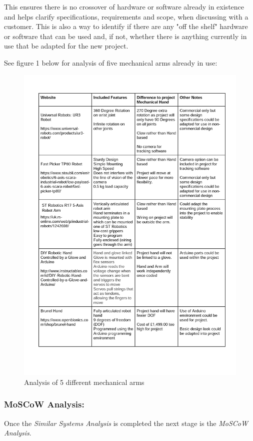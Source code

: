 \documentclass[progress]{cmpreport}
\begin{document}
This ensures there is no crossover of hardware or software already in existence and helps clarify specifications, requirements and scope, when discussing with a customer. This is also a way to identify if there are any "off the shelf" hardware or software that can be used and, if not, whether there is anything currently in use that be adapted for the new project.

See figure 1 below for analysis of five mechanical arms already in use:

\begin{figure}[H] 
	\caption{Analysis of 5 different mechanical arms}
	\centering
	\includegraphics[trim=0cm 2.8cm 0cm 0.15cm, width=1 \textwidth, height=0.75 \textheight]{photos/SSA.jpg}
\end{figure}

\subsubsection{MoSCoW Analysis:}
Once the \textit{Similar Systems Analysis} is completed the next stage is the \textit{MoSCoW Analysis}.
\end{document}
